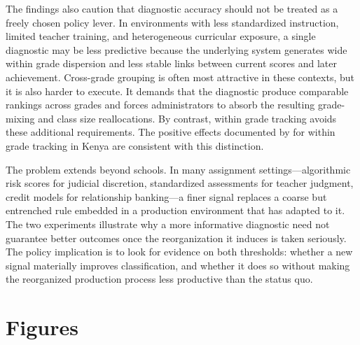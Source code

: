 \documentclass[11pt]{article}
\begin{document}
The findings also caution that diagnostic accuracy should not be treated as a freely chosen policy lever. In environments with less standardized instruction, limited teacher training, and heterogeneous curricular exposure, a single diagnostic may be less predictive because the underlying system generates wide within grade dispersion and less stable links between current scores and later achievement. Cross-grade grouping is often most attractive in these contexts, but it is also harder to execute. It demands that the diagnostic produce comparable rankings across grades and forces administrators to absorb the resulting grade-mixing and class size reallocations. By contrast, within grade tracking avoids these additional requirements. The positive effects documented by \citet{duflo2011peer} for within grade tracking in Kenya are consistent with this distinction.

The problem extends beyond schools. In many assignment settings---algorithmic risk scores for judicial discretion, standardized assessments for teacher judgment, credit models for relationship banking---a finer signal replaces a coarse but entrenched rule embedded in a production environment that has adapted to it. The two experiments illustrate why a more informative diagnostic need not guarantee better outcomes once the reorganization it induces is taken seriously. The policy implication is to look for evidence on both thresholds: whether a new signal materially improves classification, and whether it does so without making the reorganized production process less productive than the status quo.



\clearpage
\singlespacing

\doublespacing


\clearpage
\section*{Figures}
\end{document}
